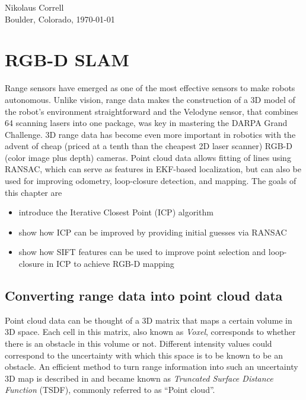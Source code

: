 \documentclass[paper=6.14in:9.21in,pagesize=pdftex,11pt,twoside,openright]{scrbook}
\begin{document}
\begin{flushright}
Nikolaus Correll\\
Boulder, Colorado, \today
\end{flushright}








%











\chapter{RGB-D SLAM}
 Range sensors have emerged as one of the most effective sensors to make robots autonomous. Unlike vision, range data makes the construction of a 3D model of the robot's environment straightforward and the Velodyne sensor, that combines 64 scanning lasers into one package, was key in mastering the DARPA Grand Challenge.  3D range data has become even more important in robotics with the advent of cheap (priced at a tenth than the cheapest 2D laser scanner) RGB-D (color image plus depth) cameras. Point cloud data allows fitting of lines using RANSAC, which can serve as features in EKF-based localization, but can also be used for improving odometry, loop-closure detection, and mapping. The goals of this chapter are
\begin{itemize}
\item introduce the Iterative Closest Point (ICP) algorithm
\item show how ICP can be improved by providing initial guesses via RANSAC
\item show how SIFT features can be used to improve point selection and loop-closure in ICP to achieve RGB-D mapping
\end{itemize}

\section{Converting range data into point cloud data}
Point cloud data can be thought of a 3D matrix that maps a certain volume in 3D space. Each cell in this matrix, also known as \emph{Voxel}, corresponds to whether there is an obstacle in this volume or not. Different intensity values could correspond to the uncertainty with which this space is to be known to be an obstacle. An efficient method to turn range information into such an uncertainty 3D map is described in \cite{curless96} and became known as \emph{Truncated Surface Distance Function} (TSDF), commonly referred to as ``Point cloud''.
\end{document}
